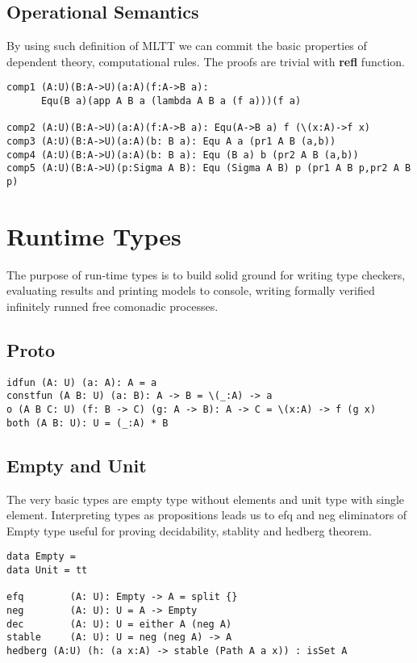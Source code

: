 \documentclass{article}
\begin{document}
\subsection{Operational Semantics}

By using such definition of MLTT we can commit the basic properties
of dependent theory, computational rules. The proofs are trivial
with {\bf refl} function.

\begin{lstlisting}[mathescape=true]
comp1 (A:U)(B:A->U)(a:A)(f:A->B a):
      Equ(B a)(app A B a (lambda A B a (f a)))(f a)

comp2 (A:U)(B:A->U)(a:A)(f:A->B a): Equ(A->B a) f (\(x:A)->f x)
comp3 (A:U)(B:A->U)(a:A)(b: B a): Equ A a (pr1 A B (a,b))
comp4 (A:U)(B:A->U)(a:A)(b: B a): Equ (B a) b (pr2 A B (a,b))
comp5 (A:U)(B:A->U)(p:Sigma A B): Equ (Sigma A B) p (pr1 A B p,pr2 A B p)
\end{lstlisting}

\section{Runtime Types}

The purpose of run-time types is to build solid ground for
writing type checkers, evaluating results and printing models to console,
writing formally verified infinitely runned free comonadic processes.

\subsection{Proto}

\begin{lstlisting}[mathescape=true]
idfun (A: U) (a: A): A = a
constfun (A B: U) (a: B): A -> B = \(_:A) -> a
o (A B C: U) (f: B -> C) (g: A -> B): A -> C = \(x:A) -> f (g x)
both (A B: U): U = (_:A) * B
\end{lstlisting}

\subsection{Empty and Unit}

The very basic types are empty type without elements and unit type with single element.
Interpreting types as propositions leads us to efq and neg eliminators of Empty type useful
for proving decidability, stablity and hedberg theorem.

\begin{lstlisting}[mathescape=true]
data Empty =
data Unit = tt

efq        (A: U): Empty -> A = split {}
neg        (A: U): U = A -> Empty
dec        (A: U): U = either A (neg A)
stable     (A: U): U = neg (neg A) -> A
hedberg (A:U) (h: (a x:A) -> stable (Path A a x)) : isSet A
\end{lstlisting}
\end{document}
